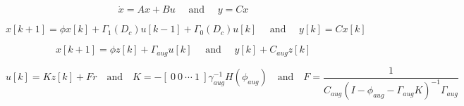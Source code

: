 \begin{equation}
\dot{x}  =  A x  +   B u  \quad{\text{   and   } }\quad  y  =  C x  
\label{eq:code1}
\end{equation}


\begin{equation}
x[k+1]= \phi x [k]+ \Gamma_1(D_c)u[k-1]+\Gamma_0(D_c)u[k] \quad \text{ and } \quad y[k] = C x[k]
\label{eq:code2}
\end{equation}


\begin{equation}
x[k+1]= \phi z [k]+ \Gamma_{aug}u[k] \quad \text{ and } \quad y[k] + C_{aug} z[k]
\label{eq:code3}
\end{equation}


\begin{equation}
u[k] = Kz[k] + Fr \quad \text{and} \quad K = -[ \ 0 \ 0 \ \cdots \ 1 \ ] \gamma_{aug}^{-1} H(\phi_{aug}) \quad \text{and} \quad F = \dfrac{1}{C_{aug} (I-\phi_{aug}-\Gamma_{aug}K)^{-1}\Gamma_{aug}}
\label{eq:code4}
\end{equation}